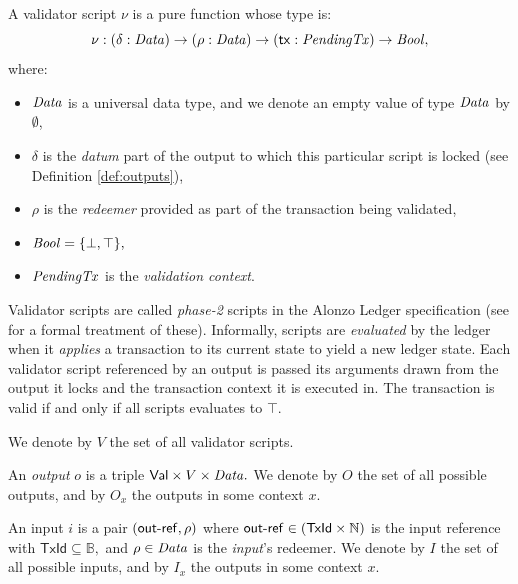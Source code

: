 \begin{definition}
A validator script $\nu$ is a pure function whose type is:
\[
  \nu : (\delta : \mathit{Data}) \to (\rho : \mathit{Data}) \to (\mathsf{tx} : \mathit{PendingTx})
  \to\mathit{Bool},
\]
where: 
\begin{itemize}
    \item $\mathit{Data}$ is a universal data type, and we denote an empty value of type $\mathit{Data}$ by $\emptyset$,  
    \item $\delta$ is the \emph{datum} part of the output to which this particular script is locked (see Definition \ref{def:outputs}),
    \item $\rho$ is the \emph{redeemer} provided as part of the transaction being validated,
    \item $\mathit{Bool} = \{\bot, \top\},$
    \item $\mathit{PendingTx}$ is the \emph{validation context}.
\end{itemize}
\end{definition}

Validator scripts are called \emph{phase-2} scripts in the Alonzo Ledger specification (see \cite{alozon-spec} for a formal treatment of these). Informally, scripts are \emph{evaluated} by the ledger when it \emph{applies} a transaction to its current state to yield a new ledger state. Each validator script referenced by an output is passed its arguments drawn from the output it locks and the transaction context it is executed in. The transaction is valid if and only if all scripts evaluates to $\top.$

We denote by $V$ the set of all validator scripts.

\begin{definition}[Outputs]
\label{def:outputs}
An \emph{output} $o$ is a triple $\mathsf{Val} \times V \times \mathit{Data}.$
We denote by $O$ the set of all possible outputs, and by $O_x$ the outputs in some context $x$.
\end{definition}

\begin{definition}[Inputs]
An input $i$ is a pair $(\mathsf{out\textsf{-}{}ref}, \rho)$ where 
$\mathsf{out\textsf{-}{}ref} \in (\mathsf{TxId} \times \mathbb{N})$ is the input reference with $\mathsf{TxId} \subseteq \mathbb{B},$ and $\rho \in \mathit{Data}$ is the \emph{input}'s redeemer.  We denote by $I$ the set of all possible inputs, and by $I_x$ the outputs in some context $x$.
\end{definition}

